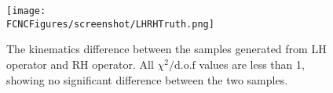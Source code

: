 \begin{figure}[H]
\centering
\texttt{[image: \\FCNCFigures/screenshot/LHRHTruth.png]}
\caption{The kinematics difference between the samples generated from LH operator and RH operator. All $\chi^2/\mathrm{d.o.f}$ values are less than 1, showing no significant difference between the two samples.}
\label{fig:LHRHTruth}
\end{figure}